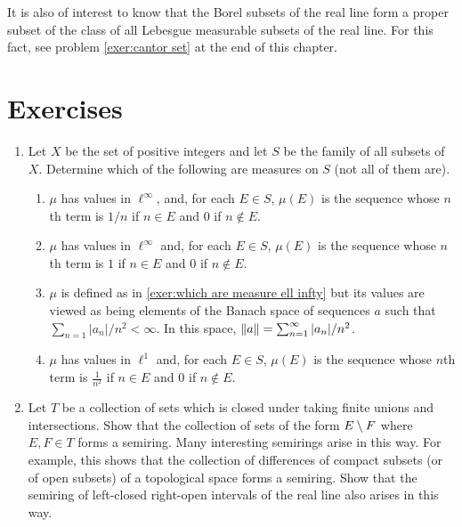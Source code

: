 It is also of interest to know that the Borel subsets of the real line form a proper subset of the class of all Lebesgue measurable subsets of the real line. For this fact, see problem \ref{exer:cantor set} at the end of this chapter.

\section{Exercises}

\begin{enumerate}[label=\arabic*),ref=\arabic*]
\item\label{exer:ex of measures}
Let $X$ be the set of positive integers and let $S$ be the family of all subsets of $X$. Determine which of the following are measures on $S$ (not all of them are).
\begin{enumerate}[label=\alph*),ref=\alph*)]
    \item $\mu$ has values in $\ell^\infty$, and, for each $E \in S$, $\mu(E)$ is the sequence whose $n$th term is $1 / n$ if $n \in E$ and 0 if $n \notin E$.
    
    \item\label{exer:which are measure ell infty}
    $\mu$ has values in $\ell^\infty$ and, for each $E \in S$, $\mu(E)$ is the sequence whose $n$th term is $1$ if $n \in E$ and $0$ if $n \notin E$.
    
    \item $\mu$ is defined as in \ref{exer:which are measure ell infty} but its values are viewed as being elements of the Banach space of sequences $a$ such that $\sum_{n=1}|a_n|/n^2<\infty$. In this space, $\norm{a}=\sum_{n=1}^\infty|a_n|/n^2$.
    
    \item $\mu$ has values in $\ell^1$ and, for each $E\in S$, $\mu(E)$ is the sequence whose $n$th term is $\frac1{n^2}$ if $n\in E$ and $0$ if $n\notin E$.
\end{enumerate}

\item Let $T$ be a collection of sets which is closed under taking finite unions and intersections. Show that the collection of sets of the form $E\setminus F$ where $E,F\in T$ forms a semiring. Many interesting semirings arise in this way. For example, this shows that the collection of differences of compact subsets (or of open subsets) of a topological space forms a semiring. Show that the semiring of left-closed right-open intervals of the real line also arises in this way.


\end{enumerate}
